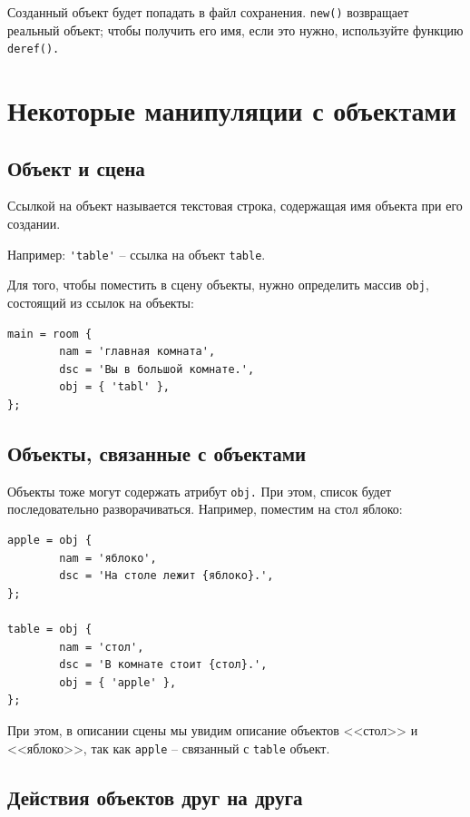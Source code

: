 \documentclass[12pt]{article}
\begin{document}
Созданный объект будет попадать в файл сохранения. \verb/new()/ возвращает реальный объект; чтобы получить его имя, если это нужно, используйте функцию  \verb/deref()./

\section{Некоторые манипуляции с объектами}

\subsection{Объект и сцена}

Ссылкой на объект называется текстовая строка, содержащая имя объекта при его создании.

Например: \verb/'table'/ -- ссылка на объект \verb/table/.

Для того, чтобы поместить в сцену объекты, нужно определить массив \verb/obj/, состоящий из ссылок на объекты:

\begin{verbatim}
main = room {
        nam = 'главная комната',
        dsc = 'Вы в большой комнате.',
        obj = { 'tabl' },
};
\end{verbatim}

\subsection{Объекты, связанные с объектами}


Объекты тоже могут содержать атрибут \verb/obj./ При этом, список будет последовательно разворачиваться. Например, поместим на стол яблоко:

\begin{verbatim}
apple = obj {
        nam = 'яблоко',
        dsc = 'На столе лежит {яблоко}.',
};

table = obj {
        nam = 'стол',
        dsc = 'В комнате стоит {стол}.',
        obj = { 'apple' },
};
\end{verbatim}

При этом, в описании сцены мы увидим описание объектов <<стол>> и <<яблоко>>, так как \verb/apple/ -- связанный с \verb/table/ объект.

\subsection{Действия объектов друг на друга}
\end{document}
